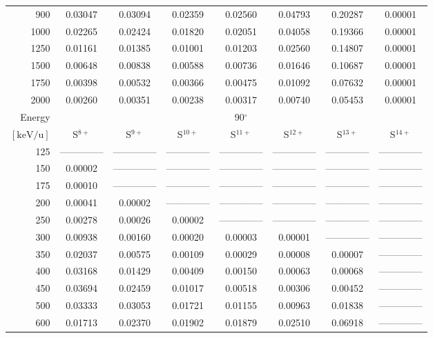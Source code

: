 \begin{table}[ht]
\begin{tabular}{r|c|c|c|c|c|c|c}
      900 & 0.03047 & 0.03094 & 0.02359 & 0.02560 & 0.04793 & 0.20287 & 0.00001 \\
     1000 & 0.02265 & 0.02424 & 0.01820 & 0.02051 & 0.04058 & 0.19366 & 0.00001 \\
     1250 & 0.01161 & 0.01385 & 0.01001 & 0.01203 & 0.02560 & 0.14807 & 0.00001 \\
     1500 & 0.00648 & 0.00838 & 0.00588 & 0.00736 & 0.01646 & 0.10687 & 0.00001 \\
     1750 & 0.00398 & 0.00532 & 0.00366 & 0.00475 & 0.01092 & 0.07632 & 0.00001 \\
     2000 & 0.00260 & 0.00351 & 0.00238 & 0.00317 & 0.00740 & 0.05453 & 0.00001 \\ \cline{1-8}
    Energy & \multicolumn{7}{c}{90$^\circ$} \\ \cline{2-8}
    $\mathrm{[keV/u]}$ & S$^{8+}$ & S$^{9+}$ & S$^{10+}$ & S$^{11+}$ & S$^{12+}$ & S$^{13+}$ & S$^{14+}$ \\ \cline{1-8}
      125 & -------------- & -------------- & -------------- & -------------- & -------------- & -------------- & -------------- \\
      150 & 0.00002 & -------------- & -------------- & -------------- & -------------- & -------------- & -------------- \\
      175 & 0.00010 & -------------- & -------------- & -------------- & -------------- & -------------- & -------------- \\
      200 & 0.00041 & 0.00002 & -------------- & -------------- & -------------- & -------------- & -------------- \\
      250 & 0.00278 & 0.00026 & 0.00002 & -------------- & -------------- & -------------- & -------------- \\
      300 & 0.00938 & 0.00160 & 0.00020 & 0.00003 & 0.00001 & -------------- & -------------- \\
      350 & 0.02037 & 0.00575 & 0.00109 & 0.00029 & 0.00008 & 0.00007 & -------------- \\
      400 & 0.03168 & 0.01429 & 0.00409 & 0.00150 & 0.00063 & 0.00068 & -------------- \\
      450 & 0.03694 & 0.02459 & 0.01017 & 0.00518 & 0.00306 & 0.00452 & -------------- \\
      500 & 0.03333 & 0.03053 & 0.01721 & 0.01155 & 0.00963 & 0.01838 & -------------- \\
      600 & 0.01713 & 0.02370 & 0.01902 & 0.01879 & 0.02510 & 0.06918 & -------------- \\

\end{tabular}
\end{table}
